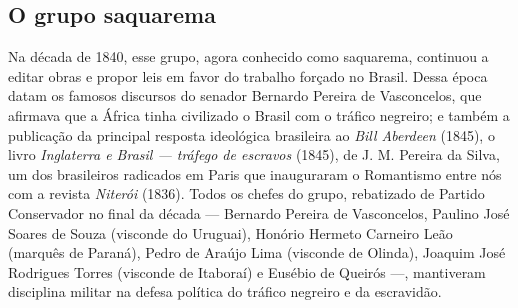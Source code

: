 \subsection{O grupo saquarema}

Na década de 1840, esse grupo, agora conhecido como saquarema, continuou
a editar obras e propor leis em favor do trabalho forçado no Brasil.
Dessa época datam os famosos discursos do senador Bernardo Pereira de
Vasconcelos, que afirmava que a África tinha civilizado o Brasil com o
tráfico negreiro; e também a publicação da principal resposta
ideológica brasileira ao \textit{Bill Aberdeen} (1845), o livro
\textit{Inglaterra e Brasil --- tráfego de escravos} (1845), de J. M.
Pereira da Silva, um dos brasileiros radicados em Paris que inauguraram
o Romantismo entre nós com a revista \textit{Niterói} (1836). Todos os
chefes do grupo, rebatizado de Partido Conservador no final da década ---
Bernardo Pereira de Vasconcelos, Paulino José Soares de Souza (visconde
do Uruguai), Honório Hermeto Carneiro Leão (marquês de Paraná), Pedro
de Araújo Lima (visconde de Olinda), Joaquim José Rodrigues Torres
(visconde de Itaboraí) e Eusébio de Queirós ---, mantiveram disciplina
militar na defesa política do tráfico negreiro e da escravidão. 

